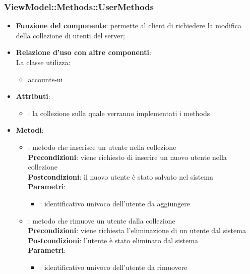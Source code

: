 \subsubsection{ViewModel::Methods::UserMethods}
\begin{itemize}
\item\textbf{Funzione del componente}: permette al client di richiedere la modifica della collezione di utenti del server;
	\item\textbf{Relazione d'uso con altre componenti}: \\
La classe utilizza:
	\begin{itemize}
		\item accounts-ui
	\end{itemize}
\item\textbf{Attributi}:
	\begin{itemize}
		\item{}: la collezione sulla quale verranno implementati i methods\\
	\end{itemize}
\item\textbf{Metodi}:
	\begin{itemize}
		\item{}: metodo che inserisce un utente nella collezione\\
		\textbf{Precondizioni}: viene richiesto di inserire un nuovo utente nella collezione\\
		\textbf{Postcondizioni}: il nuovo utente è stato salvato nel sistema\\
		\textbf{Parametri}:
			\begin{itemize}
				\item{}: identificativo univoco dell'utente da aggiungere\\
			\end{itemize}
		\item{}: metodo che rimuove un utente dalla collezione\\
		\textbf{Precondizioni}: viene richiesta l'eliminazione di un utente dal sistema\\
		\textbf{Postcondizioni}: l'utente è stato eliminato dal sistema\\
		\textbf{Parametri}:
			\begin{itemize}
				\item{}: identificativo univoco dell'utente da rimuovere\\
			\end{itemize}
	\end{itemize}
\end{itemize}

